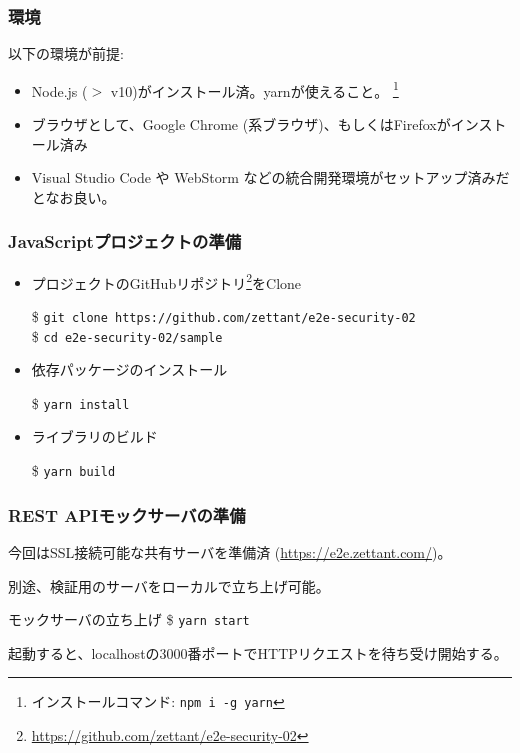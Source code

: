 \documentclass[12pt,dvipdfmx]{beamer}
\begin{document}
\begin{frame}
\frametitle{環境}
以下の環境が前提:
\begin{itemize}
 \item Node.js ($>$ v10)がインストール済。yarnが使えること。 \footnote[frame]{インストールコマンド: \texttt{npm i -g yarn}}
 \item ブラウザとして、Google Chrome (系ブラウザ)、もしくはFirefoxがインストール済み
 \item Visual Studio Code や WebStorm などの統合開発環境がセットアップ済みだとなお良い。
\end{itemize}
\end{frame}

\begin{frame}
\frametitle{JavaScriptプロジェクトの準備}
\begin{itemize}
\item プロジェクトのGitHubリポジトリ\footnote[frame]{\url{https://github.com/zettant/e2e-security-02}}をClone\\
\begin{exampleblock}{}
\footnotesize
\$ \texttt{git clone https://github.com/zettant/e2e-security-02}\\
\$ \texttt{cd e2e-security-02/sample}
\end{exampleblock}
\item 依存パッケージのインストール
\begin{exampleblock}{}
\$ \texttt{yarn install}
\end{exampleblock}
\item ライブラリのビルド
\begin{exampleblock}{}
\$ \texttt{yarn build}
\end{exampleblock}
\end{itemize}
\end{frame}

\begin{frame}
\frametitle{REST APIモックサーバの準備}
今回はSSL接続可能な共有サーバを準備済 (\url{https://e2e.zettant.com/})。

\vspace{2ex}

別途、検証用のサーバをローカルで立ち上げ可能。
\begin{exampleblock}{\small モックサーバの立ち上げ}
\$ \texttt{yarn start}
\end{exampleblock}
起動すると、localhostの3000番ポートでHTTPリクエストを待ち受け開始する。
\end{frame}
\end{document}
